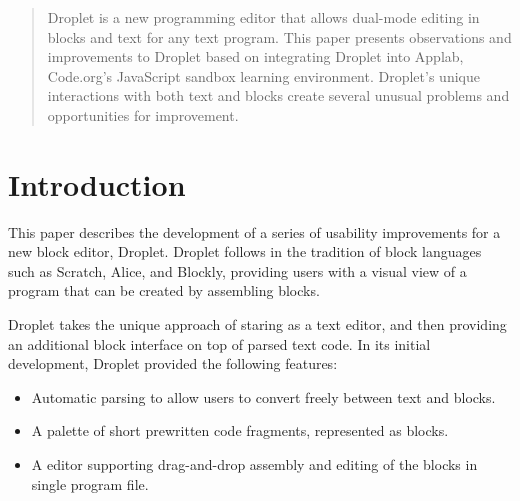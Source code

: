 \documentclass[conference]{IEEEtran}
\begin{document}
\begin{abstract}
Droplet is a new programming editor that allows dual-mode editing in blocks and text for any text program. This paper presents observations and improvements to Droplet based on integrating Droplet into Applab, Code.org's JavaScript sandbox learning environment. Droplet's unique interactions with both text and blocks create several unusual problems and opportunities for improvement.

\end{abstract}





%
\IEEEpeerreviewmaketitle

\section{Introduction}
  This paper describes the development of a series of usability improvements for a new block editor, Droplet.  Droplet follows in the tradition of block languages such as Scratch, Alice, and Blockly, providing users with a visual view of a program that can be created by assembling blocks.

  Droplet takes the unique approach of staring as a text editor, and then providing an additional block interface on top of parsed text code. In its initial development, Droplet provided the following features:

\begin{itemize}
  \item Automatic parsing to allow users to convert freely between text and blocks.
  \item A palette of short prewritten code fragments, represented as blocks.
  \item A editor supporting drag-and-drop assembly and editing of the blocks in single program file.
\end{itemize}
\end{document}

